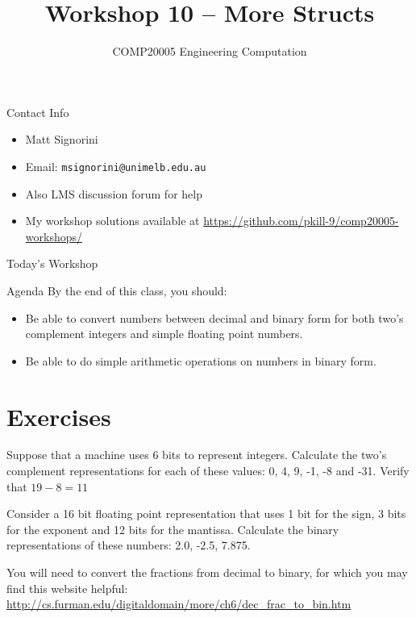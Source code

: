 \documentclass{beamer}
\title{Workshop 10 -- More Structs}
\author{COMP20005 Engineering Computation}
\institute{The University of Melbourne}
\begin{document}
\renewcommand{\tt}[1]{\texttt{#1}}

\begin{frame}
    \titlepage
\end{frame}

\begin{frame}{Contact Info}
    \begin{itemize}
        \item Matt Signorini
        \item Email: \tt{msignorini@unimelb.edu.au}
        \item Also LMS discussion forum for help
        \item My workshop solutions available at \url{https://github.com/pkill-9/comp20005-workshops/}
    \end{itemize}
\end{frame}

\begin{frame}{Today's Workshop}
    \begin{block}{Agenda}
        By the end of this class, you should:
        \begin{itemize}
            \item Be able to convert numbers between decimal and binary
                form for both two's complement integers and simple 
                floating point numbers.
            \item Be able to do simple arithmetic operations on numbers
                in binary form.
        \end{itemize}
    \end{block}
\end{frame}

\section{Exercises}

\begin{frame}{13.1}
    Suppose that a machine uses 6 bits to represent integers. Calculate
    the two's complement representations for each of these values:
    0, 4, 9, -1, -8 and -31. Verify that $19 - 8 = 11$
\end{frame}

\begin{frame}{13.2}
    Consider a 16 bit floating point representation that uses 1 bit for 
    the sign, 3 bits for the exponent and 12 bits for the mantissa. 
    Calculate the binary representations of these numbers: 2.0, -2.5, 
    7.875.

    You will need to convert the fractions from decimal to binary, for
    which you may find this website helpful: 
    \url{http://cs.furman.edu/digitaldomain/more/ch6/dec\_frac\_to\_bin.htm}
\end{frame}
\end{document}
